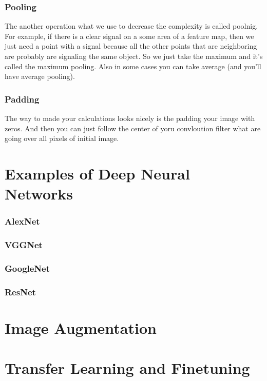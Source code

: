 \subsubsection*{Pooling}

The another operation what we use to decrease the complexity is called poolnig. For example, if there is a clear signal on a some area of a feature map, then we just need a point with a signal because all the other points that are neighboring are probably are signaling the same object. So we just take the maximum and it's called the maximum pooling. Also in some cases you can take average (and you'll have average pooling).

\subsubsection*{Padding}

The way to made your calculations looks nicely is the padding your image with zeros. And then you can just follow the center of yoru convloution filter what are going over all pixels of initial image.

\section{Examples of Deep Neural Networks}

\subsubsection*{AlexNet}

\subsubsection*{VGGNet}

\subsubsection*{GoogleNet}

\subsubsection*{ResNet}

\section{Image Augmentation}

\section{Transfer Learning and Finetuning}